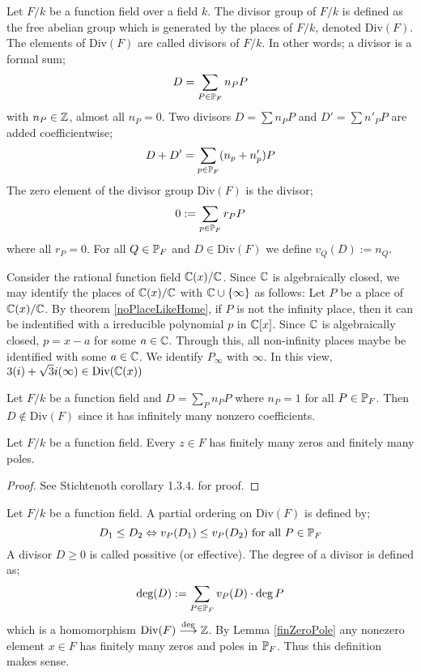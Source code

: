 	

\begin{definition} \label{Divisor}
	Let $F/k $ be a function field over a 
	field $k$. The divisor group of $F/k$ is defined 
	as the free abelian group which is generated by 
	the places of $F/k$, denoted $\text{Div}(F)$. The 
	elements of $\text{Div}(F)$ are called divisors of $F/k$. 
	In other words; a divisor is a formal sum;
	$$ D = \sum_{P \in \mathbb{P}_F } n_P P $$ with $n_P \in \mathbb{Z}$, 
	almost all $n_P = 0$. Two divisors $D = \sum n_P P$ and
	$D' = \sum n'_P P $ are added coefficientwise;
	$$ D + D' = \sum_{p \in \mathbb{P}_F } (n_p + n'_p) P$$ The 
	zero element of the divisor group $\text{Div}(F)$ is the divisor;
	$$ 0 := \sum_{p \in \mathbb{P}_F} r_P P$$ where all $r_P =  0$. 
	For all $Q \in \mathbb{P}_F $ and $D \in \text{Div} (F)$ we define
	$v_Q(D) := n_Q$.
\end{definition}

\begin{example}
	Consider the rational function field $\mathbb{C}(x)/\mathbb{C}$. Since 
	$\mathbb{C} $ is algebraically closed, we may identify the places
	of $\mathbb{C}(x)/\mathbb{C}$ with $\mathbb{C} \cup \lbrace \infty \rbrace $
	as follows: Let $P$ be a place of $\mathbb{C}(x)/\mathbb{C}$.
	By theorem \ref{noPlaceLikeHome}, if $P$ is not the infinity 
	place, then it can be indentified with 
	a irreducible polynomial $p$ in $\mathbb{C}[x]$. 
	Since $\mathbb{C}$ is algebraically closed,
	$p = x - a$ for some $a \in \mathbb{C}$. Through this, 
	all non-infinity places maybe be identified with some 
	$a \in \mathbb{C}$. We identify $P_\infty$ with $\infty$.
	In this view, $3(i) + \sqrt{3}i(\infty) \in \text{Div}(\mathbb{C}(x))$
\end{example}

\begin{example}
	Let $F/k$ be a function field and $D = \sum_Pn_PP $ where 
	$n_P = 1 $ for all $P\in \mathbb{P}_F$. Then $D  \notin \text{Div}(F)$
	since it has infinitely many nonzero coefficients.  
\end{example}

\begin{lemma} \label{finZeroPole}
	Let $F/k$ be a function field. Every $z \in F$ has finitely
	many zeros and finitely many poles.
\end{lemma}

\begin{proof}
	See Stichtenoth corollary 1.3.4. for proof. 
\end{proof}

\begin{definition} \label{divValuation}
	Let $F/k $ be a function field. 
	A partial ordering on $\text{Div}(F)$ is defined by;
	$$ D_1 \leq D_2 \Leftrightarrow v_P(D_1) \leq v_P(D_2) \text{ for all } P\in \mathbb{P}_F $$ 
	A divisor $D \geq 0 $ is called possitive (or effective). 
	The degree of a divisor is defined as;
	$$ \text{deg}(D) := \sum _{P \in \mathbb{P}_F}v_P (D) \cdot \deg P  $$ 
	which is a homomorphism $\text{Div}(F) \stackrel{\text{deg}}{\longrightarrow} \mathbb{Z} $. 
	By Lemma \ref{finZeroPole} any nonezero element $x \in F$ 
	has finitely many zeros and poles in $\mathbb{P}_F$. Thus this 
	definition makes sense.
\end{definition}


